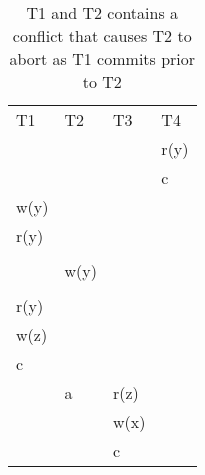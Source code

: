 \begin{table}[h!]
    \begin{tabular}{l|l|l|l}
        T1   & T2   & T3   & T4   \\
        &      &      & r(y) \\
        &      &      & c    \\
        w(y) &      &      &      \\
        r(y) &      &      &      \\
        &      &      &      \\
        & w(y) &      &      \\
        &      &      &      \\
        r(y) &      &      &      \\
        w(z) &      &      &      \\
        c    &      &      &      \\
        & a    & r(z) &      \\
        &      & w(x) &      \\
        &      & c    &
    \end{tabular}
    \caption{T1 and T2 contains a conflict that causes T2 to abort as T1 commits prior to T2}
\end{table}